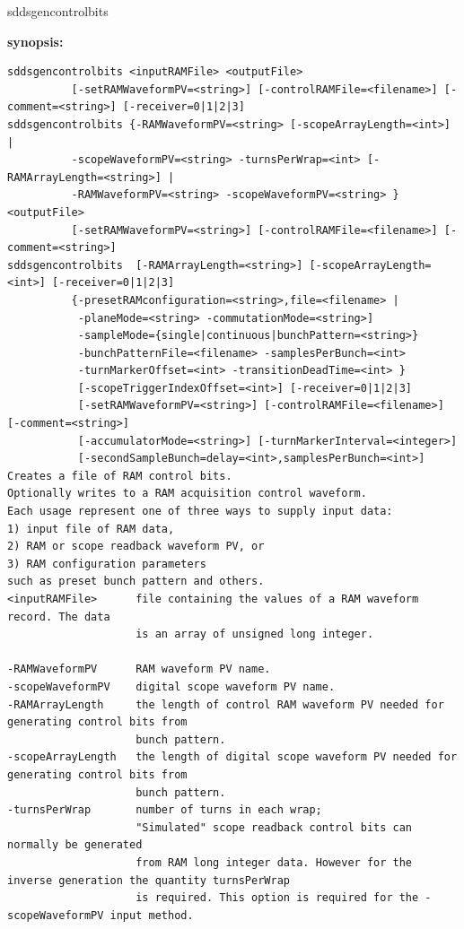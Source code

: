\begin{sddsprog}{sddsgencontrolbits}
\item {\bf synopsis:} 
%
%
\small
\begin{verbatim}
sddsgencontrolbits <inputRAMFile> <outputFile>
          [-setRAMWaveformPV=<string>] [-controlRAMFile=<filename>] [-comment=<string>] [-receiver=0|1|2|3]
sddsgencontrolbits {-RAMWaveformPV=<string> [-scopeArrayLength=<int>] |
          -scopeWaveformPV=<string> -turnsPerWrap=<int> [-RAMArrayLength=<string>] |
          -RAMWaveformPV=<string> -scopeWaveformPV=<string> } <outputFile>
          [-setRAMWaveformPV=<string>] [-controlRAMFile=<filename>] [-comment=<string>]
sddsgencontrolbits  [-RAMArrayLength=<string>] [-scopeArrayLength=<int>] [-receiver=0|1|2|3]
          {-presetRAMconfiguration=<string>,file=<filename> |
           -planeMode=<string> -commutationMode=<string>]
           -sampleMode={single|continuous|bunchPattern=<string>}
           -bunchPatternFile=<filename> -samplesPerBunch=<int>
           -turnMarkerOffset=<int> -transitionDeadTime=<int> }
           [-scopeTriggerIndexOffset=<int>] [-receiver=0|1|2|3]
           [-setRAMWaveformPV=<string>] [-controlRAMFile=<filename>] [-comment=<string>]
           [-accumulatorMode=<string>] [-turnMarkerInterval=<integer>]
           [-secondSampleBunch=delay=<int>,samplesPerBunch=<int>]
Creates a file of RAM control bits.
Optionally writes to a RAM acquisition control waveform.
Each usage represent one of three ways to supply input data:
1) input file of RAM data,
2) RAM or scope readback waveform PV, or
3) RAM configuration parameters 
such as preset bunch pattern and others.
<inputRAMFile>      file containing the values of a RAM waveform record. The data 
                    is an array of unsigned long integer.

-RAMWaveformPV      RAM waveform PV name. 
-scopeWaveformPV    digital scope waveform PV name. 
-RAMArrayLength     the length of control RAM waveform PV needed for generating control bits from 
                    bunch pattern.
-scopeArrayLength   the length of digital scope waveform PV needed for generating control bits from 
                    bunch pattern.
-turnsPerWrap       number of turns in each wrap; 
                    "Simulated" scope readback control bits can normally be generated 
                    from RAM long integer data. However for the inverse generation the quantity turnsPerWrap 
                    is required. This option is required for the -scopeWaveformPV input method.


\end{verbatim}
\end{sddsprog}
